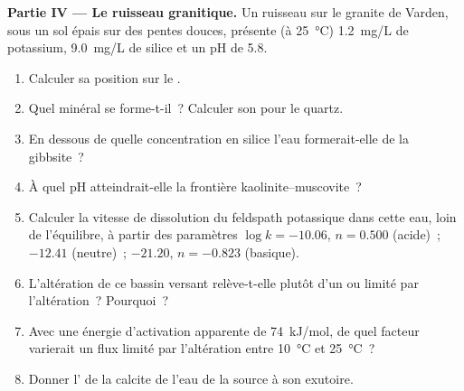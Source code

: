 \begin{problem}
\medskip\noindent\textbf{Partie IV --- Le ruisseau granitique.} Un ruisseau sur le
granite de Varden, sous un sol épais sur des pentes douces, présente (à
\qty{25}{\celsius}) \qty{1.2}{mg/L} de potassium, \qty{9.0}{mg/L} de
silice et un pH de 5.8.
\begin{enumerate}[resume]
\item Calculer sa position sur le .
\item Quel minéral se forme-t-il~? Calculer son  pour le quartz.
\item En dessous de quelle concentration en silice l'eau formerait-elle de la gibbsite~?
\item À quel pH atteindrait-elle la frontière kaolinite--muscovite~?
\item Calculer la vitesse de dissolution du feldspath potassique dans cette eau, loin de
  l'équilibre, à partir des paramètres $\log k = -10.06$, $n = 0.500$ (acide)~;
  $-12.41$ (neutre)~; $-21.20$, $n = -0.823$ (basique).
\item L'altération de ce bassin versant relève-t-elle plutôt d'un  ou
  limité par l'altération~? Pourquoi~?
\item Avec une énergie d'activation apparente de \qty{74}{kJ/mol}, de quel facteur
  varierait un flux limité par l'altération entre \qty{10}{\celsius} et
  \qty{25}{\celsius}~?
\item Donner l' de la calcite de l'eau de la source à son
  exutoire.
\end{enumerate}
\end{problem}
